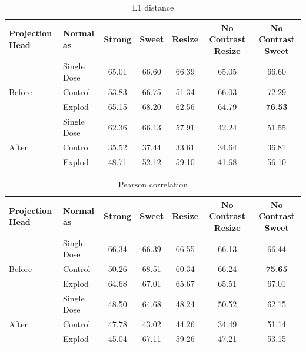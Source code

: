 \begin{table}[H]
  \centering
  \begin{tabular}{@{}llccccc@{}}
  \toprule
  Projection Head & Normal as       & Strong & Sweet & Resize & No Contrast Resize & No Contrast Sweet \\ \midrule
                  & Single Dose    & 65.01      & 66.60     & 66.39      & 65.05                  & 66.60                 \\
  Before          & Control        & 53.83      & 66.75     &  51.34     & 66.03                  & 72.29                 \\
                  & Explod         & 65.15      & 68.20     & 62.56      & 64.79                  & \textbf{76.53}                 \\ \midrule
                  & Single Dose    & 62.36      & 66.13     & 57.91      & 42.24                  & 51.55                 \\
  After           & Control        & 35.52      & 37.44     & 33.61      & 34.64                  & 36.81                 \\
                  & Explod         & 48.71      & 52.12     & 59.10      & 41.68                  & 56.10                 \\ \bottomrule
  \end{tabular}
  \caption{L1 distance}
  \label{tab:table_l}
\end{table}

\begin{table}[H]
  \centering
  \begin{tabular}{@{}llccccc@{}}
  \toprule
  Projection Head & Normal as       & Strong & Sweet & Resize & No Contrast Resize & No Contrast Sweet \\ \midrule
                  & Single Dose    & 66.34      & 66.39     & 66.55      & 66.13                  & 66.44                 \\
  Before          & Control        & 50.26      & 68.51     & 60.34      & 66.24                  & \textbf{75.65}                 \\
                  & Explod         & 64.68      & 67.01     & 65.67      & 65.51                  & 67.01                 \\ \midrule
                  & Single Dose    & 48.50      & 64.68     & 48.24      & 50.52                  & 62.15                 \\
  After           & Control        & 47.78      & 43.02     & 44.26      & 34.49                  & 51.14                 \\
                  & Explod         & 45.04      & 67.11     & 59.26      & 47.21                  & 53.15                 \\ \bottomrule
  \end{tabular}
  \caption{Pearson correlation}
  \label{tab:table_pearson_correlation}
\end{table}


